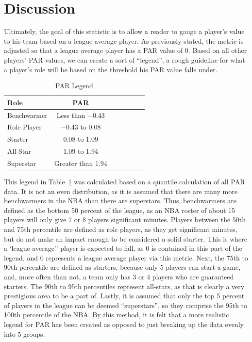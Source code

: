 \documentclass[titlepage, 12pt]{article}
\begin{document}
\section{Discussion}
Ultimately, the goal of this statistic is to allow a reader to gauge a player's 
value to his team based on a 
league average player. As previously stated, the metric is adjusted so that 
a league average player has a 
PAR value of 0. Based on all other players' PAR values, we can create a 
sort of ``legend'', a rough guideline 
for what a player's role will be based on the threshold his PAR value falls 
under.

\begin{table}[tbp]
  \caption{PAR Legend}
  \label{tab:PARLegend}
\centering
\begin{tabular}[t]{lcccccc}
  \toprule
  Role &  PAR\\
  \midrule
Benchwarmer & Less than $-0.43$\\
Role Player & $-0.43$ to 0.08\\
Starter & 0.08 to 1.09\\
All-Star & 1.09 to 1.94\\
Superstar & Greater than 1.94\\
  \bottomrule
\end{tabular}
\end{table}

This legend in Table~\ref{tab:PARLegend} was calculated based on a 
quantile 
calculation of all PAR 
data. It is not an even distribution, as 
it is assumed that there are many more benchwarmers in the NBA than 
there are superstars. Thus, 
benchwarmers are defined as the bottom 50 percent of the league, as an 
NBA roster of about 15 players 
will only give 7 or 8 players significant minutes. Players between the 50th 
and 75th percentile are defined 
as role players, as they get significant minutes, but do not make an impact 
enough to be considered a solid 
starter. This is where  a `league average'' player is expected to fall, as 0 is 
contained in this part of the 
legend, and 0 represents a league average player via this metric. Next, 
the 75th to 90th percentile are 
defined as starters, because only 5 players can start a game, and, more 
often than not, a team only has 3 
or 4 players who are guaranteed starters. The 90th to 95th percentiles 
represent all-stars, as that is clearly a 
very prestigious area to be a part of. Lastly, it is assumed that only the top 
5 percent of players in the 
league can be deemed ``superstars'', so they comprise the 95th to 100th 
percentile of the NBA. By this 
method, it is felt that a more realistic legend for PAR has been created as 
opposed to just breaking up the 
data evenly into 5 groups.
\end{document}
